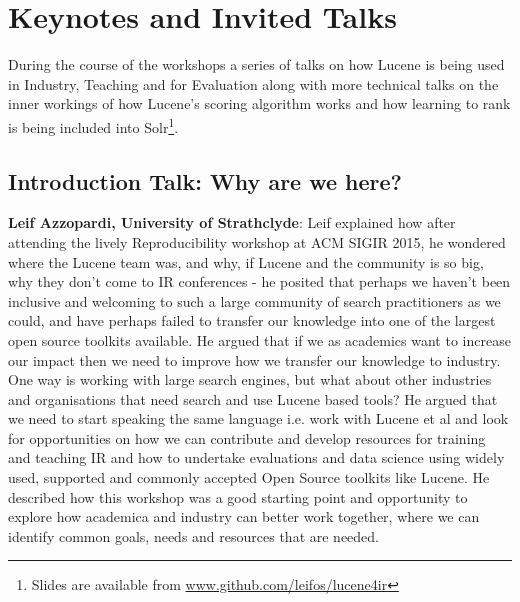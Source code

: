 \section{Keynotes and Invited Talks}
During the course of the workshops a series of talks on how Lucene is being used in Industry, Teaching and for Evaluation along with more technical talks on the inner workings of how Lucene's scoring algorithm works and how learning to rank is being included into Solr\footnote{\scriptsize{Slides are available from \url{www.github.com/leifos/lucene4ir}}}. 

\subsection*{Introduction Talk: Why are we here?}
{\bf Leif Azzopardi, University of Strathclyde}:
Leif explained how after attending the lively Reproducibility workshop at ACM SIGIR 2015, he wondered where the Lucene team was, and why, if Lucene and the community is so big, why they don't come to IR conferences - he posited that perhaps we haven't been inclusive and welcoming to such a large community of search practitioners as we could, and have perhaps failed to transfer our knowledge into one of the largest open source toolkits available. He argued that if we as academics want to increase our impact then we need to improve how we transfer our knowledge to industry. One way is working with large search engines, but what about other industries and organisations that need search and use Lucene based tools? He argued that we need to start speaking the same language i.e. work with Lucene et al and look for opportunities on how we can contribute and develop resources for training and teaching IR and how to undertake evaluations and data science using widely used, supported and commonly accepted Open Source toolkits like Lucene. He described how this workshop was a good starting point and opportunity to explore how academica and industry can better work together, where we can identify common goals, needs and resources that are needed. 










